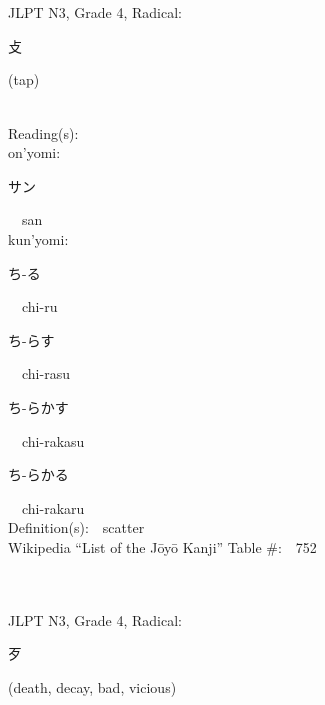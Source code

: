 \begin{multicols}{2}
\ \ \\
{\fontsize{34pt}{40pt}  }\ \ \\  %
{JLPT N3, Grade 4, Radical:\ \ {\begin{CJK}{UTF8}{min} 攴 \end{CJK}} (tap) } \\
Reading(s):\ \ \\
{\hspace*{1em}}on'yomi:\ \ \\
{\hspace*{2em}}{\begin{CJK}{UTF8}{min} サン \end{CJK}}\ \ san\ \ \\
{\hspace*{1em}}kun'yomi:\ \ \\
{\hspace*{2em}}{\begin{CJK}{UTF8}{min} ち-る \end{CJK}}\ \ chi-ru\ \ \\
{\hspace*{2em}}{\begin{CJK}{UTF8}{min} ち-らす \end{CJK}}\ \ chi-rasu\ \ \\
{\hspace*{2em}}{\begin{CJK}{UTF8}{min} ち-らかす \end{CJK}}\ \ chi-rakasu\ \ \\
{\hspace*{2em}}{\begin{CJK}{UTF8}{min} ち-らかる \end{CJK}}\ \ chi-rakaru\ \ \\
Definition(s):\ \ scatter \\
Wikipedia ``List of the J\=oy\=o Kanji'' Table \#:\ \ 752 \\
\ \ \\
{\fontsize{34pt}{40pt}  }\ \ \\  %
{JLPT N3, Grade 4, Radical:\ \ {\begin{CJK}{UTF8}{min} 歹 \end{CJK}} (death, decay, bad, vicious) } \\

\end{multicols}
